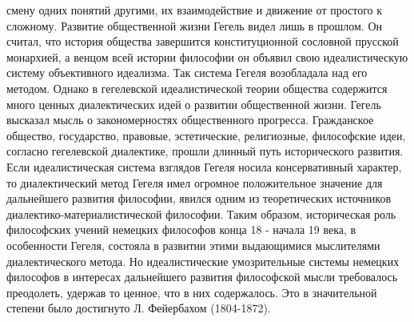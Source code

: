 \documentclass[12pt]{article}
\begin{document}
смену одних понятий другими, их взаимодействие и движение от простого к сложному.
Развитие общественной жизни Гегель видел лишь в прошлом. Он считал, что история общества завершится
конституционной  сословной  прусской  монархией,  а  венцом  всей  истории  философии  он  объявил  свою
идеалистическую систему объективного идеализма.
Так система Гегеля возобладала над его методом. Однако в гегелевской идеалистической теории общества
содержится много ценных диалектических идей о развитии общественной жизни. Гегель высказал мысль о
закономерностях  общественного  прогресса.  Гражданское  общество,  государство,  правовые,  эстетические,
религиозные,  философские  идеи,  согласно  гегелевской  диалектике,  прошли  длинный  путь  исторического
развития.
Если  идеалистическая  система  взглядов  Гегеля носила  консервативный  характер, то  диалектический метод
Гегеля  имел  огромное  положительное  значение  для  дальнейшего  развития  философии,  явился  одним  из
теоретических источников диалектико-материалистической философии.
Таким образом, историческая роль философских учений немецких философов конца 18 - начала 19 века, в
особенности  Гегеля,  состояла  в  развитии  этими  выдающимися  мыслителями  диалектического  метода.  Но
идеалистические  умозрительные  системы  немецких  философов  в  интересах  дальнейшего  развития
философской мысли требовалось преодолеть, удержав то ценное, что в них содержалось. Это в значительной
степени было достигнуто Л. Фейербахом (1804-1872).

\newpage
\end{document}
